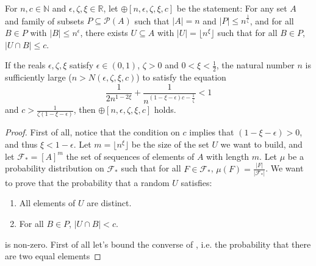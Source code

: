     \begin{definition}[Definition 4.18] \label{def:n_large_enough_property}
        For $n, c \in \mathbb{N}$ and $\epsilon, \zeta, \xi \in \mathbb{R}$, let $\oplus[n, \epsilon, \zeta, \xi, c]$ be
        the statement:
        For any set $A$ and family of subsets $P \subseteq \mathcal{P}(A)$ such that $|A| = n$ and $|P| \leq n^{\frac{1}{\zeta}}$,
        and for all $B \in P$ with $|B| \leq n^\epsilon$, there exists $U \subseteq A$ with $|U| = \lfloor n^\xi \rfloor$ such that
        for all $B \in P$, $|U \cap B| \leq c$.
    \end{definition}

    \begin{lemma}[Lemma 4.19] \label{lem:n_large_enough_valid_values}
        If the reals $\epsilon, \zeta, \xi$ satisfy $\epsilon \in (0,1)$, $\zeta > 0$ and $0 < \xi < \frac{1}{2}$,
        the natural number $n$ is sufficiently large ($n > N(\epsilon, \zeta, \xi, c)$) to satisfy the equation
            \begin{equation} \label{eq:n_large_enough_valid_values.1}
                \frac{1}{2n^{1-2\xi}} + \frac{1}{n^{(1 - \xi - \epsilon)c - \frac{1}{\zeta}}} < 1
            \end{equation}
        and $c > \frac{1}{\zeta (1 - \xi - \epsilon)}$,
        then $\oplus[n, \epsilon, \zeta, \xi, c]$ holds.
        \begin{proof}
            First of all, notice that the condition on $c$ implies that $(1 - \xi - \epsilon) > 0$, and thus $\xi < 1 -\epsilon$.
            Let $m = \lfloor n^\xi \rfloor$ be the size of the set $U$ we want to build, and let $\mathcal{F}_* = [A]^m$
            the set of sequences of elements of $A$ with length $m$.
            Let $\mu$ be a probability distribution on $\mathcal{F}_*$ such that for all $F \in \mathcal{F}_*$,
            $\mu(F) = \frac{|F|}{|\mathcal{F}_*|}$.
            We want to prove that the probability that a random $U$ satisfies:
            \begin{enumerate}
                \item\label{itm:n_large_enough_valid_values.1} All elements of $U$ are distinct.
                \item\label{itm:n_large_enough_valid_values.2} For all $B \in P$, $|U \cap B| < c$.
            \end{enumerate}
            is non-zero.
            First of all let's bound the converse of , i.e. the probability that there are two equal elements

\end{proof}
\end{lemma}
